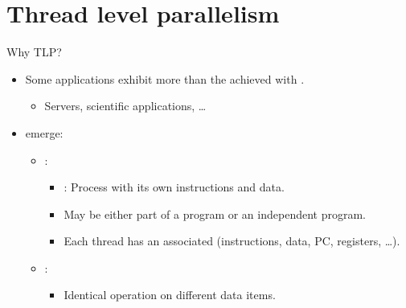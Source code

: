 \section{Thread level parallelism}

\begin{frame}[t]{Why TLP?}
\begin{itemize}
  \item Some applications exhibit more  than
        the achieved with .
    \begin{itemize}
      \item Servers, scientific applications, \ldots
    \end{itemize}

  \item {} emerge:
    \begin{itemize}
      \item {}:
        \begin{itemize}

          \item {}: 
                Process with its own instructions and data.
          \item May be either part of a program or an independent program.
          \item Each thread has an associated  
                (instructions, data, PC, registers, \ldots).
        \end{itemize}
      \item {}:
        \begin{itemize}
          \item Identical operation on different data items.
        \end{itemize}
    \end{itemize}
\end{itemize}
\end{frame}

